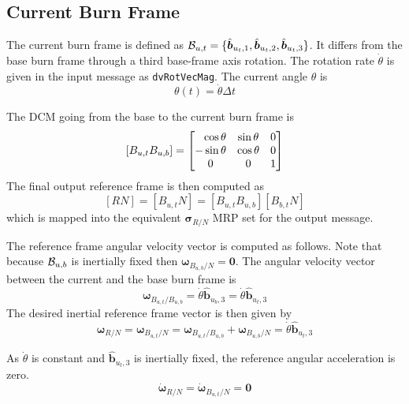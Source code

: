\subsection{Current Burn Frame}
The current burn frame is defined as ${\cal B}_{u,t} = \{\hat{\bm b}_{u_{t},1}, \hat{\bm b}_{u_{t},2}, \hat{\bm b}_{u_{t},3} \}$.  It differs from the base burn frame through a third base-frame axis rotation.  The rotation rate $\dot\theta$ is given in the input message as {\tt dvRotVecMag}.  The current angle $\theta$ is 
\begin{equation}
	\label{eq:dvAttGuid5}
		\theta(t) = \dot\theta \Delta t
\end{equation}

The DCM going from the base to the current burn frame is 
\begin{equation}
	\label{eq:dvAttGuid6}
	[B_{u,t}B_{u,b}] = \begin{bmatrix}
		\hfill\cos\theta & \sin\theta & 0 \\
		-\sin\theta & \cos\theta & 0 \\
		0 & 0 & 1
	\end{bmatrix}
\end{equation}
The final output reference frame is then computed as
\begin{equation}
	\label{eq:dvAttGuid7}
	[RN] = [B_{u,t}N] =  [B_{u,t}B_{u,b}] [B_{b,t}N] 
\end{equation}
which is mapped into the equivalent $\bm\sigma_{R/N}$ MRP set for the output message. 

The reference frame angular velocity vector is computed as follows.  Note that because ${\cal B}_{u,b}$ is inertially fixed then $\bm\omega_{B_{u,b}/N} = \bm 0$.  The angular velocity vector between the current and the base burn frame is
\begin{equation}
	\label{eq:dvAttGuid8}
	\bm\omega_{B_{u,t}/B_{u,b}} = \dot\theta \hat{\bm b}_{u_{b},3} = \dot\theta \hat{\bm b}_{u_{t},3}
\end{equation}
The desired inertial reference frame vector is then given by 
\begin{equation}
	\label{eq:dvAttGuid9}
	\bm\omega_{R/N} = \bm\omega_{B_{u,t}/N} = \bm\omega_{B_{u,t}/B_{u,b}}+ \bm\omega_{B_{u,b}/N} = \dot\theta \hat{\bm b}_{u_{t},3}
\end{equation}

As $\dot\theta$ is constant and $\hat{\bm b}_{u_{t},3}$ is inertially fixed, the reference angular acceleration is zero.
\begin{equation}
	\label{eq:dvAttGuid10}
	\dot{\bm\omega}_{R/N} = \dot{\bm\omega}_{B_{u,t}/N} = \bm 0
\end{equation}




